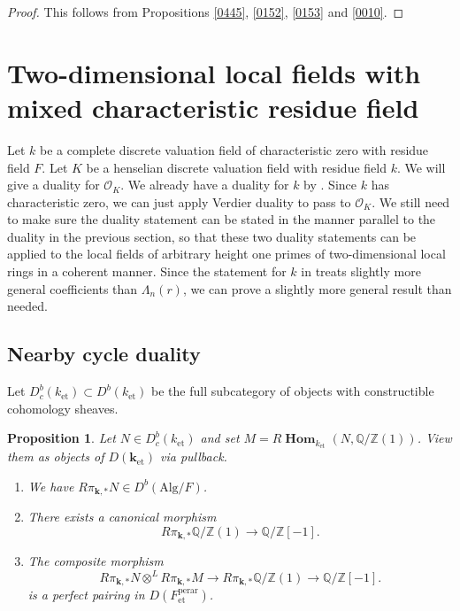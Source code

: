 \documentclass{amsart}
\newtheorem{Prop}[Thm]{Proposition}
\theoremstyle{remark}
\numberwithin{equation}{subsection}
\newcommand{\Order}{\mathcal{O}}
\newcommand{\tensor}{\mathbin{\otimes}}
\newcommand{\Z}{\mathbb{Z}}
\newcommand{\Q}{\mathbb{Q}}
\newcommand{\et}{\mathrm{et}}
\newcommand{\perar}{\mathrm{perar}}
\newcommand{\Alg}{\mathrm{Alg}}
\newcommand{\alg}[1]{\mathbf{#1}}
\DeclareMathOperator{\sheafhom}{\alg{Hom}}
\begin{document}
\begin{proof}
	This follows from Propositions \ref{0445}, \ref{0152}, \ref{0153} and \ref{0010}.
\end{proof}


\section{Two-dimensional local fields with mixed characteristic residue field}
\label{0190}

Let $k$ be a complete discrete valuation field of characteristic zero with residue field $F$.
Let $K$ be a henselian discrete valuation field with residue field $k$.
We will give a duality for $\Order_{K}$.
We already have a duality for $k$ by \cite{Suz22Duality}.
Since $k$ has characteristic zero,
we can just apply Verdier duality to pass to $\Order_{K}$.
We still need to make sure the duality statement can be stated
in the manner parallel to the duality in the previous section,
so that these two duality statements can be applied to
the local fields of arbitrary height one primes of two-dimensional local rings
in a coherent manner.
Since the statement for $k$ in \cite{Suz22Duality} treats slightly more general coefficients than $\Lambda_{n}(r)$,
we can prove a slightly more general result than needed.


\subsection{Nearby cycle duality}
\label{0191}

Let $D^{b}_{c}(k_{\et}) \subset D^{b}(k_{\et})$ be the full subcategory of objects
with constructible cohomology sheaves.

\begin{Prop} \label{0192}
	Let $N \in D^{b}_{c}(k_{\et})$
	and set $M = R \sheafhom_{k_{\et}}(N, \Q / \Z(1))$.
	View them as objects of $D(\alg{k}_{\et})$ via pullback.
	\begin{enumerate}
		\item \label{0193}
			We have $R \pi_{\alg{k}, \ast} N \in D^{b}(\Alg / F)$.
		\item \label{0194}
			There exists a canonical morphism
				\[
						R \pi_{\alg{k}, \ast} \Q / \Z(1)
					\to
						\Q / \Z[-1].
				\]
		\item \label{0195}
			The composite morphism
				\[
						R \pi_{\alg{k}, \ast} N \tensor^{L} R \pi_{\alg{k}, \ast} M
					\to
						R \pi_{\alg{k}, \ast} \Q / \Z(1)
					\to
						\Q / \Z[-1].
				\]
			is a perfect pairing in $D(F^{\perar}_{\et})$.
	\end{enumerate}
\end{Prop}
\end{document}
